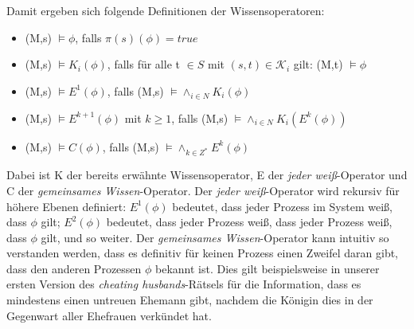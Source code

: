 Damit ergeben sich folgende Definitionen der Wissensoperatoren:
\begin{itemize}
\item (M,s) $\vDash \phi$, falls $\pi(s)(\phi) = true$
\item (M,s) $\vDash K_i(\phi)$, falls für alle t $\in S$ mit $(s,t) \in \mathcal{K}_i $ gilt: (M,t) $\vDash \phi$
\item (M,s) $\vDash E^1(\phi)$, falls (M,s) $\vDash\land_{i\in N}K_i(\phi)$
\item (M,s) $\vDash E^{k+1}(\phi)$ mit $k\ge 1$, falls (M,s) $\vDash\land_{i\in N}K_i(E^k(\phi))$
\item (M,s) $\vDash C(\phi)$, falls (M,s) $\vDash\land_{k\in Z^*}E^k(\phi)$
\end{itemize}

Dabei ist K der bereits erwähnte Wissensoperator, E der \textit{jeder weiß}-Operator und C der \textit{gemeinsames Wissen}-Operator.
Der \textit{jeder weiß}-Operator wird rekursiv für höhere Ebenen definiert: $E^1(\phi)$ bedeutet, dass jeder Prozess im System weiß, dass $\phi$ gilt; $E^2(\phi)$ bedeutet, dass jeder Prozess weiß, dass jeder Prozess weiß, dass $\phi$ gilt, und so weiter.
Der \textit{gemeinsames Wissen}-Operator kann intuitiv so verstanden werden, dass es definitiv für keinen Prozess einen Zweifel daran gibt, dass den anderen Prozessen $\phi$ bekannt ist. Dies gilt beispielsweise in unserer ersten Version des \textit{cheating husbands}-Rätsels für die Information, dass es mindestens einen untreuen Ehemann gibt, nachdem die Königin dies in der Gegenwart aller Ehefrauen verkündet hat. 